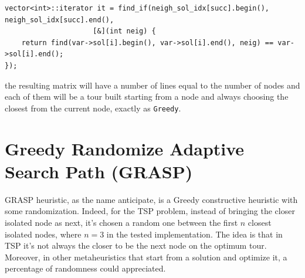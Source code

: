 \begin{lstlisting}
vector<int>::iterator it = find_if(neigh_sol_idx[succ].begin(), neigh_sol_idx[succ].end(),
					 [&](int neig) {
	return find(var->sol[i].begin(), var->sol[i].end(), neig) == var->sol[i].end();
});
\end{lstlisting}

the resulting matrix will have a number of lines equal to the number of nodes and each of them will be a tour built starting from a node and always choosing the closest from the current node, exactly as \texttt{Greedy}.

\section{Greedy Randomize Adaptive Search Path (GRASP)}\label{sec:grasp}
GRASP heuristic, as the name anticipate, is a Greedy constructive heuristic with some randomization. Indeed, for the TSP problem, instead of bringing the closer isolated node as next, it's chosen a random one between the first $ n $ closest isolated nodes, where $ n = 3 $ in the tested implementation.
The idea is that in TSP it's not always the closer to be the next node on the optimum tour. Moreover, in other metaheuristics that start from a solution and optimize it, a percentage of randomness could appreciated.

